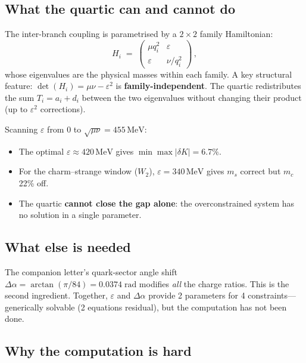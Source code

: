 \documentclass[12pt,a4paper]{article}
\newcommand{\MeV}{\,\mathrm{MeV}}
\begin{document}
\subsection{What the quartic can and cannot do}

The inter-branch coupling is parametrised by a $2 \times 2$
family Hamiltonian:
\begin{equation}
  H_i \;=\;
  \begin{pmatrix}
    \mu q_i^2 & \varepsilon \\
    \varepsilon & \nu/q_i^2
  \end{pmatrix}\,,
  \label{eq:H2x2}
\end{equation}
whose eigenvalues are the physical masses within each family.
A key structural feature: $\det(H_i) = \mu\nu - \varepsilon^2$ is
\textbf{family-independent}.  The quartic redistributes the sum
$T_i = a_i + d_i$ between the two eigenvalues without changing
their product (up to $\varepsilon^2$ corrections).

Scanning $\varepsilon$ from $0$ to $\sqrt{\mu\nu} = 455\MeV$:
\begin{itemize}
\item The optimal $\varepsilon \approx 420\MeV$ gives $\min \max |\delta K| = 6.7\%$.
\item For the charm--strange window ($W_2$), $\varepsilon = 340\MeV$
  gives $m_s$ correct but $m_c$ 22\% off.
\item The quartic \textbf{cannot close the gap alone}: the overconstrained
  system has no solution in a single parameter.
\end{itemize}

\subsection{What else is needed}

The companion letter's quark-sector angle shift
$\Delta\alpha = \arctan(\pi/84) = 0.0374\;\mathrm{rad}$
modifies \emph{all} the charge ratios.  This is the second ingredient.
Together, $\varepsilon$ and $\Delta\alpha$ provide 2 parameters for
4 constraints---generically solvable (2 equations residual), but the
computation has not been done.

\subsection{Why the computation is hard}
\end{document}
